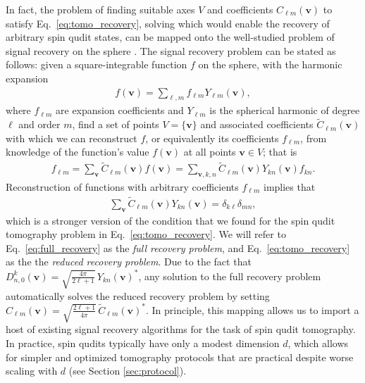 \documentclass[notitlepage,twocolumn]{revtex4-2}
\newcommand{\p}[1]{\left(#1\right)} %
\renewcommand{\v}{\bm} %
\renewcommand{\set}[1]{\{#1\}} %
\begin{document}
In fact, the problem of finding suitable axes $V$ and coefficients $C_{\ell m}\p{\v v}$ to satisfy Eq.~\eqref{eq:tomo_recovery}, solving which would enable the recovery of arbitrary spin qudit states, can be mapped onto the well-studied problem of signal recovery on the sphere \cite{mcewen2011novel, rauhut2011sparse, alem2012sparse, khalid2014optimaldimensionality}.
The signal recovery problem can be stated as follows: given a square-integrable function $f$ on the sphere, with the harmonic expansion
\begin{align}
  f\p{\v v} = \sum_{\ell,m} f_{\ell m} Y_{\ell m}\p{\v v},
\end{align}
where $f_{\ell m}$ are expansion coefficients and $Y_{\ell m}$ is the spherical harmonic of degree $\ell$ and order $m$, find a set of points $V=\set{\v v}$ and associated coefficients $\tilde C_{\ell m}\p{\v v}$ with which we can reconstruct $f$, or equivalently its coefficients $f_{\ell m}$, from knowledge of the function's value $f\p{\v v}$ at all points $\v v\in V$; that is
\begin{align}
  f_{\ell m} = \sum_{\v v} \tilde C_{\ell m}\p{\v v} f\p{\v v}
  = \sum_{\v v,k,n} \tilde C_{\ell m}\p{\v v} Y_{kn}\p{\v v} f_{kn}.
\end{align}
Reconstruction of functions with arbitrary coefficients $f_{\ell m}$ implies that
\begin{align}
  \sum_{\v v} \tilde C_{\ell m}\p{\v v} Y_{kn}\p{\v v}
  = \delta_{k\ell} \delta_{mn},
  \label{eq:full_recovery}
\end{align}
which is a stronger version of the condition that we found for the spin qudit tomography problem in Eq.~\eqref{eq:tomo_recovery}.
We will refer to Eq.~\eqref{eq:full_recovery} as the {\it full recovery problem}, and Eq.~\eqref{eq:tomo_recovery} as the the {\it reduced recovery problem}.
Due to the fact that $D^k_{n,0}\p{\v v} = \sqrt{\frac{4\pi}{2\ell+1}}\, Y_{kn}\p{\v v}^*$, any solution to the full recovery problem automatically solves the reduced recovery problem by setting $C_{\ell m}\p{\v v} = \sqrt{\frac{2\ell+1}{4\pi}}\, \tilde C_{\ell m}\p{\v v}^*$.
In principle, this mapping allows us to import a host of existing signal recovery algorithms \cite{mcewen2011novel, rauhut2011sparse, alem2012sparse, khalid2014optimaldimensionality} for the task of spin qudit tomography.
In practice, spin qudits typically have only a modest dimension $d$, which allows for simpler and optimized tomography protocols that are practical despite worse scaling with $d$ (see Section \ref{sec:protocol}).
\end{document}
